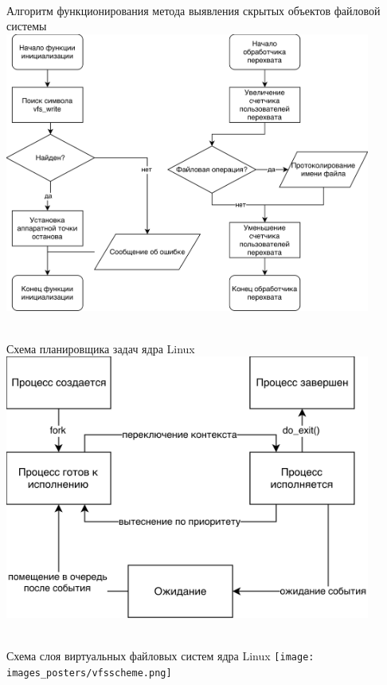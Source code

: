 \documentclass{beamer}
\begin{document}
\newpage
\hfill
\\
\vspace{2em}
Алгоритм функционирования метода выявления скрытых
объектов файловой системы
\vfill
\includegraphics[width=0.9\textwidth]{images_posters/hook_fs.png}
\vfill

\newpage
\hfill
\\
\vspace{2em}
Схема планировщика задач ядра Linux
\vfill
\includegraphics[width=0.9\textwidth]{images_posters/scheduler.png}
\vfill

\newpage
\hfill
\\
\vspace{2em}
Схема слоя виртуальных файловых систем ядра Linux
\vfill
\texttt{[image: images\_posters/vfsscheme.png]}
\vfill
\end{document}
